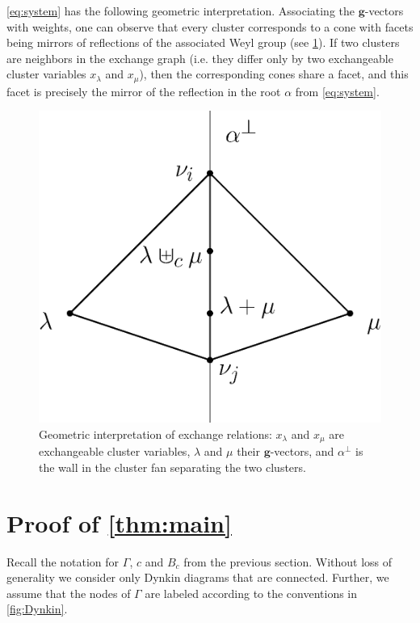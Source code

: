 \documentclass[pdftex]{sigma}
\numberwithin{equation}{section}
\numberwithin{figure}{section}
\newcommand{\bg}{\mathbf{g}}
\begin{document}
  \begin{Remark}
    \label{geom}
    \cref{eq:system} has the following geometric interpretation.
    Associating the $\bg$-vectors with weights, one can observe that every cluster corresponds to a cone with facets being mirrors of reflections of the associated Weyl group (see \cref{fig:exchange_relation}).
    If two clusters are neighbors in the exchange graph (i.e. they differ only by two exchangeable cluster variables $x_\lambda$ and $x_\mu$), then the corresponding cones share a facet, and this facet is precisely the mirror of the reflection in the root $\alpha$ from \cref{eq:system}.
   \begin{figure}[ht]
      \begin{center}
        \includegraphics[scale=0.4]{cones-section.eps}
      \end{center}
      \caption{Geometric interpretation of exchange relations: $x_\lambda$ and $x_\mu$ are exchangeable cluster variables, $\lambda$ and $\mu$ their $\bg$-vectors, and $\alpha^\perp$ is the wall in the cluster fan separating the two clusters.}
      \label{fig:exchange_relation}
    \end{figure}
\end{Remark}

\section{Proof of \cref{thm:main}}
\label{proof}
  Recall the notation for $\Gamma$, $c$ and $B_c$ from the previous section.
  Without loss of generality we consider only Dynkin diagrams that are connected.
  Further, we assume that the nodes of $\Gamma$ are labeled according to the conventions in \cref{fig:Dynkin}.
\end{document}
